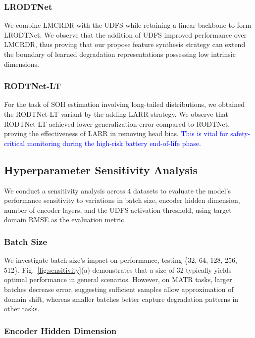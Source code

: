 \documentclass[lettersize,journal]{IEEEtran}
\newcommand{\rev}[1]{\textcolor{blue}{#1}}
\begin{document}
\subsubsection{LRODTNet}

We combine LMCRDR with the UDFS while retaining a linear backbone to form LRODTNet. We observe that the addition of UDFS improved performance over LMCRDR, thus proving that our propose feature synthesis strategy can extend the boundary of learned degradation representations possessing low intrinsic dimensions.

\subsubsection{RODTNet-LT}

For the task of SOH estimation involving long-tailed distributions, we obtained the RODTNet-LT variant by the adding LARR strategy. We observe that RODTNet-LT achieved lower generalization error compared to RODTNet, proving the effectiveness of LARR in removing head bias. \rev{This is vital for safety-critical monitoring during the high-risk battery end-of-life phase.}

\subsection{Hyperparameter Sensitivity Analysis}

We conduct a sensitivity analysis across 4 datasets to evaluate the model's performance sensitivity to variations in batch size, encoder hidden dimension, number of encoder layers, and the UDFS activation threshold, using target domain RMSE as the evaluation metric.

\subsubsection{Batch Size}

We investigate batch size's impact on performance, testing \{32, 64, 128, 256, 512\}. Fig.~\ref{fig:sensitivity}(a) demonstrates that a size of 32 typically yields optimal performance in general scenarios. However, on MATR tasks, larger batches decrease error, suggesting sufficient samples allow approximation of domain shift, whereas smaller batches better capture degradation patterns in other tasks.

\subsubsection{Encoder Hidden Dimension}
\end{document}
